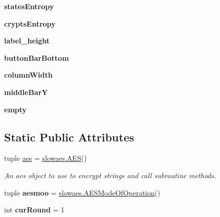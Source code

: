 \begin{DoxyCompactItemize}
\item 
\hypertarget{classsimplegui_1_1_main_scene_ab7c01609fb1e306ec066971dcfb291b0}{{\bfseries states\-Entropy}}\label{classsimplegui_1_1_main_scene_ab7c01609fb1e306ec066971dcfb291b0}

\item 
\hypertarget{classsimplegui_1_1_main_scene_a021b0c1cb13db8497dba560911986ed4}{{\bfseries crypts\-Entropy}}\label{classsimplegui_1_1_main_scene_a021b0c1cb13db8497dba560911986ed4}

\item 
\hypertarget{classsimplegui_1_1_main_scene_a2a749ea3c4e4aace671f83ea68b16d25}{{\bfseries label\-\_\-height}}\label{classsimplegui_1_1_main_scene_a2a749ea3c4e4aace671f83ea68b16d25}

\item 
\hypertarget{classsimplegui_1_1_main_scene_af672fec772fc90129f8e5ba92f82ad5d}{{\bfseries button\-Bar\-Bottom}}\label{classsimplegui_1_1_main_scene_af672fec772fc90129f8e5ba92f82ad5d}

\item 
\hypertarget{classsimplegui_1_1_main_scene_ae86b310e4226fc8a1b93b8563841e9c7}{{\bfseries column\-Width}}\label{classsimplegui_1_1_main_scene_ae86b310e4226fc8a1b93b8563841e9c7}

\item 
\hypertarget{classsimplegui_1_1_main_scene_ab1659015b41aa39ee60c3275452953fe}{{\bfseries middle\-Bar\-Y}}\label{classsimplegui_1_1_main_scene_ab1659015b41aa39ee60c3275452953fe}

\item 
\hypertarget{classsimplegui_1_1_main_scene_a77e225283588bdbaa435c00b268dc5ae}{{\bfseries empty}}\label{classsimplegui_1_1_main_scene_a77e225283588bdbaa435c00b268dc5ae}

\end{DoxyCompactItemize}
\subsection*{Static Public Attributes}
\begin{DoxyCompactItemize}
\item 
tuple \hyperlink{classsimplegui_1_1_main_scene_afc11de68b1f5e44d5831ca15698bbd69}{aes} = \hyperlink{classslowaes_1_1_a_e_s}{slowaes.\-A\-E\-S}()
\begin{DoxyCompactList}\small\item\em An aes object to use to encrypt strings and call subroutine methods. \end{DoxyCompactList}\item 
\hypertarget{classsimplegui_1_1_main_scene_afdac18342ee21e270adcd32168b2392a}{tuple {\bfseries aesmoo} = \hyperlink{classslowaes_1_1_a_e_s_mode_of_operation}{slowaes.\-A\-E\-S\-Mode\-Of\-Operation}()}\label{classsimplegui_1_1_main_scene_afdac18342ee21e270adcd32168b2392a}

\item 
\hypertarget{classsimplegui_1_1_main_scene_a60e750d2c3a510f6f3116a1f418f11dc}{int {\bfseries cur\-Round} = 1}\label{classsimplegui_1_1_main_scene_a60e750d2c3a510f6f3116a1f418f11dc}

\end{DoxyCompactItemize}


